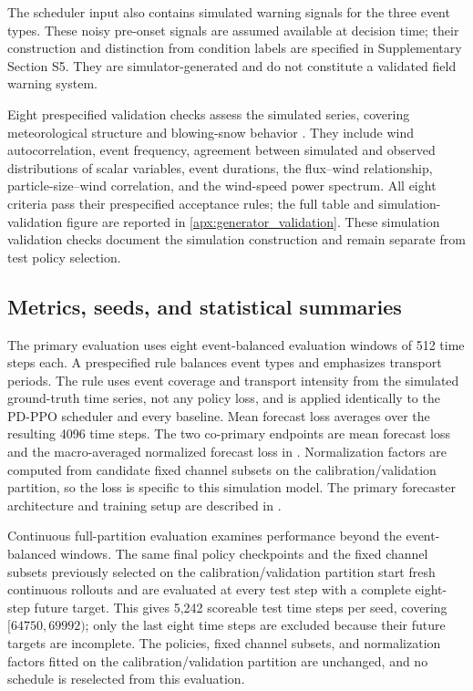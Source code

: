 The scheduler input also contains simulated warning signals for the three event
types. These noisy pre-onset signals are assumed available at decision time;
their construction and distinction from condition labels are specified in
Supplementary Section S5. They are simulator-generated and do not constitute a
validated field warning system.

Eight prespecified validation checks assess the simulated series, covering
meteorological structure and blowing-snow behavior \citep{Aloni2024}. They include wind
autocorrelation, event frequency, agreement between simulated and observed
distributions of scalar variables, event durations,
the flux--wind relationship, particle-size--wind correlation, and the wind-speed
power spectrum. All eight criteria pass their prespecified acceptance rules; the
full table and simulation-validation figure are
reported in \ref{apx:generator_validation}. These simulation validation checks document the
simulation construction and remain separate from test policy selection.

\subsection{Metrics, seeds, and statistical summaries}

The primary evaluation uses eight event-balanced evaluation windows of 512 time steps each.
A prespecified rule balances event types and emphasizes
transport periods. The rule
uses event coverage and transport intensity from the simulated ground-truth time series,
not any policy loss, and is applied identically to the PD-PPO scheduler and every baseline. Mean
forecast loss averages  over the resulting 4096
time steps. The two co-primary endpoints are mean forecast loss and the
macro-averaged normalized forecast loss in .
Normalization factors are computed from candidate fixed channel subsets on the
calibration/validation partition, so the loss is
specific to this simulation model. The primary forecaster architecture
and training setup are described in .

Continuous full-partition evaluation examines performance beyond the event-balanced
windows. The same final policy checkpoints and the fixed channel subsets previously
selected on the calibration/validation partition start fresh continuous rollouts and are evaluated at every
test step with a complete eight-step future target. This gives 5,242 scoreable test time steps per seed, covering
$[64750,69992)$; only the last eight
time steps are excluded because their future targets are incomplete. The policies, fixed channel subsets, and normalization factors fitted on the calibration/validation partition are
unchanged, and no schedule is reselected from
this evaluation.

